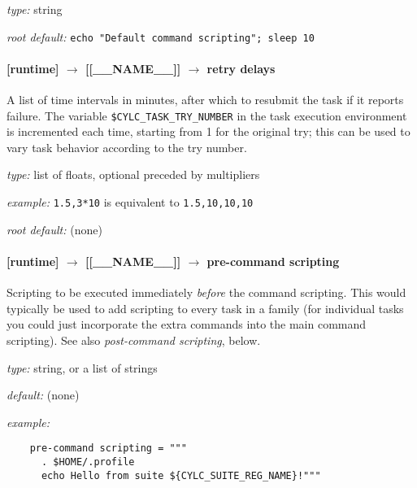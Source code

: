 \begin{myitemize}
\item {\em type:} string
\item {\em root default:} \lstinline=echo "Default command scripting"; sleep 10=
\end{myitemize}


\paragraph[retry delays]{[runtime] $\rightarrow$ [[\_\_NAME\_\_]] $\rightarrow$ retry delays}
\label{RefRetries}

A list of time intervals in minutes, after which to resubmit the task if
it reports failure. The variable \lstinline=$CYLC_TASK_TRY_NUMBER= in
the task execution environment is incremented each time, starting from 1
for the original try; this can be used to vary task behavior according
to the try number. 

\begin{myitemize}
\item {\em type:} list of floats, optional preceded by multipliers
\item {\em example:} \lstinline=1.5,3*10= is equivalent to \lstinline=1.5,10,10,10=
\item {\em root default:} (none)
\end{myitemize}

\paragraph[pre-command scripting]{ [runtime] $\rightarrow$ [[\_\_NAME\_\_]] $\rightarrow$ pre-command scripting}

Scripting to be executed immediately {\em before} the command scripting.
This would typically be used to add scripting to every task in a family
(for individual tasks you could just incorporate the extra commands into
the main command scripting). See also {\em post-command scripting},
below.

\begin{myitemize}
\item {\em type:} string, or a list of strings
\item {\em default:} (none)
\item {\em example:} 
 \begin{lstlisting}
    pre-command scripting = """
      . $HOME/.profile
      echo Hello from suite ${CYLC_SUITE_REG_NAME}!"""
 \end{lstlisting}
\end{myitemize}

